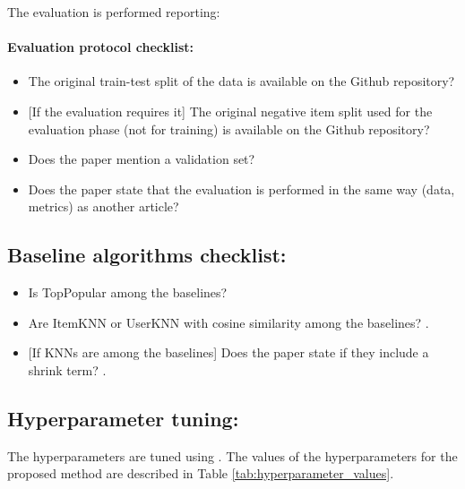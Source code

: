 The evaluation is performed reporting: 


\paragraph{Evaluation protocol checklist:}
\begin{itemize}
    \item The original train-test split of the data is available on the Github repository? 
    \item {[If the evaluation requires it]} The original negative item split used for the evaluation phase (not for training) is available on the Github repository? 
    \item Does the paper mention a validation set? 
    \item Does the paper state that the evaluation is performed in the same way (data, metrics) as another article? 
\end{itemize}



\subsection{Baseline algorithms checklist:}
\begin{itemize}
    \item Is TopPopular among the baselines? 
    \item Are ItemKNN or UserKNN with cosine similarity among the baselines? .
    \item {[If KNNs are among the baselines]} Does the paper state if they include a shrink term? .
\end{itemize}



\subsection{Hyperparameter tuning:} 
The hyperparameters are tuned using . The values of the hyperparameters for the proposed method are described in Table \ref{tab:hyperparameter_values}. 

